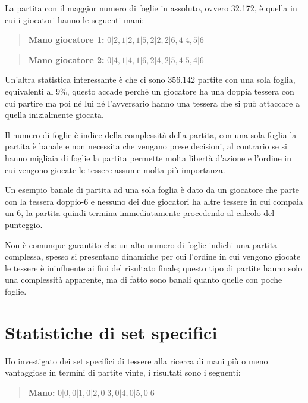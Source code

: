 \documentclass[a4paper,12pt]{report} %
\begin{document}
La partita con il maggior numero di foglie in assoluto, ovvero 32.172, è quella in cui i giocatori hanno le seguenti mani:

\begin{quote}
    \textbf{Mano giocatore 1:} \(0|2, 1|2, 1|5, 2|2, 2|6, 4|4, 5|6\)
\end{quote}

\begin{quote}
    \textbf{Mano giocatore 2:} \(0|4, 1|4, 1|6, 2|4, 2|5, 4|5, 4|6\) 
\end{quote}



Un'altra statistica interessante è che ci sono \( 356.142 \) partite con una sola foglia, equivalenti al \( 9\%\), questo accade perché un giocatore ha una doppia tessera con cui partire ma poi né lui né l'avversario hanno una tessera che si può attaccare a quella inizialmente giocata.


Il numero di foglie è indice della complessità della partita, con una sola foglia la partita è banale e non necessita che vengano prese decisioni, al contrario se si hanno migliaia di foglie la partita permette molta libertà d'azione e l'ordine in cui vengono giocate le tessere assume molta più importanza.


Un esempio banale di partita ad una sola foglia è dato da un giocatore che parte con la tessera doppio-6 e nessuno dei due giocatori ha altre tessere in cui compaia un 6, la partita quindi termina immediatamente procedendo al calcolo del punteggio.


Non è comunque garantito che un alto numero di foglie indichi una partita complessa, spesso si presentano dinamiche per cui l'ordine in cui vengono giocate le tessere è ininfluente ai fini del risultato finale; questo tipo di partite hanno solo una complessità apparente, ma di fatto sono banali quanto quelle con poche foglie.


\section{Statistiche di set specifici}

Ho investigato dei set specifici di tessere alla ricerca di mani più o meno vantaggiose in termini di partite vinte, i risultati sono i seguenti:


\begin{quote}
    \textbf{Mano:} \(0|0, 0|1, 0|2, 0|3, 0|4, 0|5, 0|6\)
\end{quote}
\end{document}
